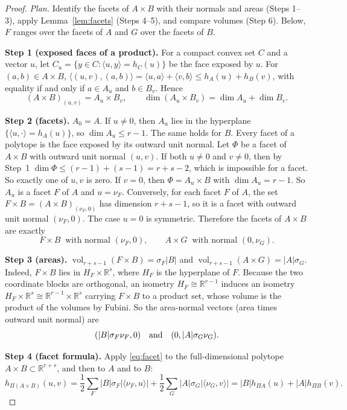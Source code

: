 \documentclass[11pt]{article}
\newcommand{\R}{\mathbb R}
\DeclareMathOperator{\vol}{vol}
\newcommand{\step}[1]{\smallskip\noindent\textbf{#1}}
\begin{document}
\begin{proof}
\emph{Plan.} Identify the facets of \(A\times B\) with their normals and
areas (Steps 1--3), apply Lemma~\ref{lem:facets} (Steps 4--5), and compare
volumes (Step 6). Below, \(F\) ranges over the facets of \(A\) and \(G\)
over the facets of \(B\).

\step{Step 1 (exposed faces of a product).} For a compact convex set \(C\)
and a vector \(u\), let \(C_u=\{y\in C:\langle u,y\rangle=h_C(u)\}\) be the
face exposed by \(u\). For \((a,b)\in A\times B\),
\(\langle(u,v),(a,b)\rangle=\langle u,a\rangle+\langle v,b\rangle
\le h_A(u)+h_B(v)\), with equality if and only if \(a\in A_u\) and
\(b\in B_v\). Hence
\[
 (A\times B)_{(u,v)}=A_u\times B_v,\qquad
 \dim(A_u\times B_v)=\dim A_u+\dim B_v.
\]

\step{Step 2 (facets).} \(A_0=A\). If \(u\ne0\), then \(A_u\) lies in the
hyperplane \(\{\langle u,\cdot\rangle=h_A(u)\}\), so \(\dim A_u\le r-1\).
The same holds for \(B\). Every facet of a polytope is the face exposed by
its outward unit normal. Let \(\Phi\) be a facet of \(A\times B\) with
outward unit normal \((u,v)\). If both \(u\ne0\) and \(v\ne0\), then by
Step~1 \(\dim\Phi\le(r-1)+(s-1)=r+s-2\), which is impossible for a facet.
So exactly one of \(u,v\) is zero. If \(v=0\), then \(\Phi=A_u\times B\)
with \(\dim A_u=r-1\). So \(A_u\) is a facet \(F\) of \(A\) and
\(u=\nu_F\). Conversely, for each facet \(F\) of \(A\), the set
\(F\times B=(A\times B)_{(\nu_F,0)}\) has dimension \(r+s-1\), so it is a
facet with outward unit normal \((\nu_F,0)\). The case \(u=0\) is
symmetric. Therefore the facets of \(A\times B\) are exactly
\[
 F\times B\ \text{ with normal }(\nu_F,0),
 \qquad
 A\times G\ \text{ with normal }(0,\nu_G).
\]

\step{Step 3 (areas).}
\(\vol_{r+s-1}(F\times B)=\sigma_F|B|\) and
\(\vol_{r+s-1}(A\times G)=|A|\sigma_G\).
Indeed, \(F\times B\) lies in \(H_F\times\R^s\), where \(H_F\) is the
hyperplane of \(F\). Because the two coordinate blocks are orthogonal, an
isometry \(H_F\cong\R^{r-1}\) induces an isometry
\(H_F\times\R^s\cong\R^{r-1}\times\R^s\) carrying \(F\times B\) to a
product set, whose volume is the product of the volumes by Fubini. So the
area-normal vectors (area times outward unit normal) are
\[
 (|B|\sigma_F\nu_F,0)
 \quad\hbox{and}\quad
 (0,|A|\sigma_G\nu_G).
\]

\step{Step 4 (facet formula).} Apply \eqref{eq:facet} to the
full-dimensional polytope \(A\times B\subset\R^{r+s}\), and then to \(A\)
and to \(B\):
\[
 h_{\Pi(A\times B)}(u,v)
 =\frac12\sum_F|B|\sigma_F|\langle\nu_F,u\rangle|
  +\frac12\sum_G|A|\sigma_G|\langle\nu_G,v\rangle|
 =|B|h_{\Pi A}(u)+|A|h_{\Pi B}(v).
\]


\end{proof}
\end{document}
